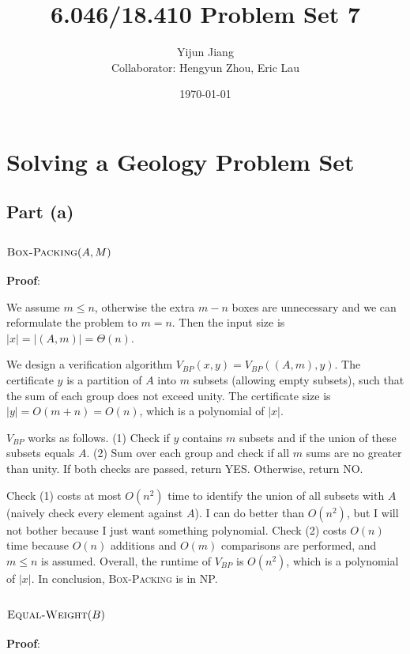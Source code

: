 \documentclass{article}
\title{6.046/18.410 Problem Set 7}
\author{Yijun Jiang\vspace{3pt}\\Collaborator: Hengyun Zhou, Eric Lau}
\date{\today}
\begin{document}
\maketitle

\section{Solving a Geology Problem Set}
\subsection{Part (a)}
\subsubsection{$\textsc{Box-Packing}(A,M)$}
\noindent\textbf{Proof}:

We assume $m\leqslant n$, otherwise the extra $m-n$ boxes are unnecessary and we can reformulate the problem to $m=n$. Then the input size is $|x|=|(A,m)|=\Theta(n)$.

We design a verification algorithm $V_{BP}(x,y)=V_{BP}((A,m),y)$. The certificate $y$ is a partition of $A$ into $m$ subsets (allowing empty subsets), such that the sum of each group does not exceed unity. The certificate size is $|y|=O(m+n)=O(n)$, which is a polynomial of $|x|$.

$V_{BP}$ works as follows. (1) Check if $y$ contains $m$ subsets and if the union of these subsets equals $A$. (2) Sum over each group and check if all $m$ sums are no greater than unity. If both checks are passed, return YES. Otherwise, return NO.

Check (1) costs at most $O(n^2)$ time to identify the union of all subsets with $A$ (naively check every element against $A$). I can do better than $O(n^2)$, but I will not bother because I just want something polynomial. Check (2) costs $O(n)$ time because $O(n)$ additions and $O(m)$ comparisons are performed, and $m\leqslant n$ is assumed. Overall, the runtime of $V_{BP}$ is $O(n^2)$, which is a polynomial of $|x|$. In conclusion, \textsc{Box-Packing} is in NP.


\subsubsection{$\textsc{Equal-Weight}(B)$}
\noindent\textbf{Proof}:
\end{document}
